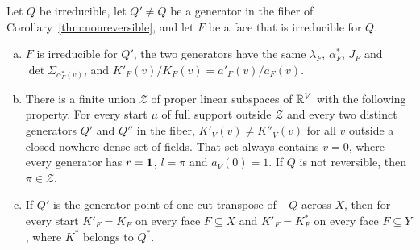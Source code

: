 \begin{proposition}\label{prop:amplitudes}
Let $Q$ be irreducible, let $Q'\ne Q$ be a generator in the fiber of
Corollary~\ref{thm:nonreversible}, and let $F$ be a face that is irreducible for $Q$.
\begin{enumerate}[(a)]
\item $F$ is irreducible for $Q'$, the two generators have the same $\lambda_F$,
$\alpha^*_F$, $J_F$ and $\det\Sigma_{\alpha^*_F(v)}$, and $K'_F(v)/K_F(v)=a'_F(v)/a_F(v)$.
\item There is a finite union $\mathcal Z$ of proper linear subspaces of $\mathbb{R}^V$ with the
following property. For every start $\mu$ of full support outside $\mathcal Z$ and every two
distinct generators $Q'$ and $Q''$ in the fiber, $K'_V(v)\ne K''_V(v)$ for all $v$ outside a
closed nowhere dense set of fields. That set always contains $v=0$, where every generator has $r=\mathbf{1}$, $l=\pi$ and
$a_V(0)=1$. If $Q$ is not reversible, then $\pi\in\mathcal Z$.
\item If $Q'$ is the generator point of one cut-transpose of $-Q$ across $X$, then for every
start $K'_F=K_F$ on every face $F\subseteq X$ and $K'_F=K^*_F$ on every face $F\subseteq Y$,
where $K^*$ belongs to $Q^*$.
\end{enumerate}
\end{proposition}


